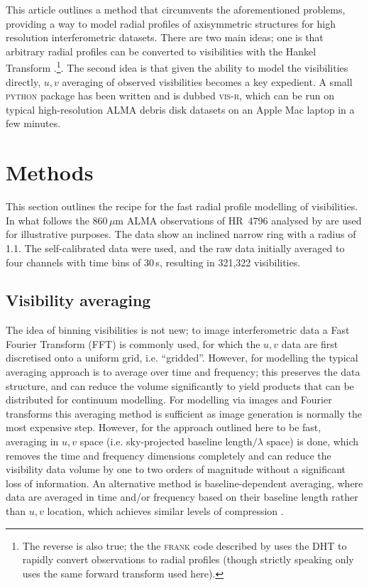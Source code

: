 \documentclass[fleqn,usenatbib]{mnras}
\begin{document}
This article outlines a method that circumvents the aforementioned problems, providing a way to model radial profiles of axisymmetric structures for high resolution interferometric datasets. There are two main ideas; one is that arbitrary radial profiles can be converted to visibilities with the Hankel Transform \citep[in this case the Discrete transform, or DHT,][]{1987CoPhC..43..181J,1994JChPh.101.3936L,2015JOSAA..32..611B}.\footnote{The reverse is also true; the the \textsc{frank} code described by \citet{2020MNRAS.tmp.1491J} uses the DHT to rapidly convert observations to radial profiles (though strictly speaking only uses the same forward transform used here).}. The second idea is that given the ability to model the visibilities directly, $u,v$ averaging of observed visibilities becomes a key expedient. A small \textsc{python} package has been written and is dubbed \textsc{vis-r}, which can be run on typical high-resolution ALMA debris disk datasets on an Apple Mac laptop in a few minutes.

\section{Methods}

This section outlines the recipe for the fast radial profile modelling of visibilities. In what follows the 860\,$\mu$m ALMA observations of HR~4796 analysed by \citet{2018MNRAS.475.4924K} are used for illustrative purposes. The data show an inclined narrow ring with a radius of 1.1\arcsec. The self-calibrated data were used, and the raw data initially averaged to four channels with time bins of 30\,s, resulting in 321,322 visibilities.

\subsection{Visibility averaging}\label{sec:avg}

The idea of binning visibilities is not new; to image interferometric data a Fast Fourier Transform (FFT) is commonly used, for which the $u,v$ data are first discretised onto a uniform grid, i.e. ``gridded''. However, for modelling the typical averaging approach is to average over time and frequency; this preserves the data structure, and can reduce the volume significantly to yield products that can be distributed for continuum modelling. For modelling via images and Fourier transforms this averaging method is sufficient as image generation is normally the most expensive step. However, for the approach outlined here to be fast, averaging in $u,v$ space (i.e. sky-projected baseline length$/\lambda$ space) is done, which removes the time and frequency dimensions completely and can reduce the visibility data volume by one to two orders of magnitude without a significant loss of information. An alternative method is baseline-dependent averaging, where data are averaged in time and/or frequency based on their baseline length rather than $u,v$ location, which achieves similar levels of compression \citep{2018MNRAS.476.2029W}.
\end{document}
